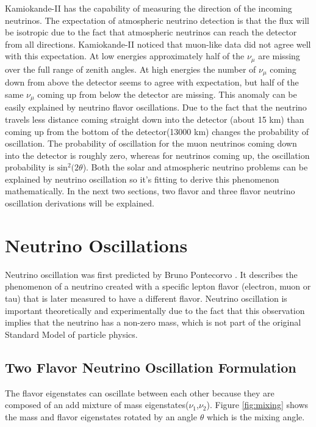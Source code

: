Kamiokande-II has the capability of measuring the direction of the incoming neutrinos. The expectation of atmospheric neutrino detection is that the flux will be isotropic due to the fact that atmospheric neutrinos can reach the detector from all directions. Kamiokande-II noticed that muon-like data did not agree well with this expectation. At low energies approximately half of the $\nu_{\mu}$ are missing over the full range of zenith angles. At high energies the number of $\nu_{\mu}$ coming down from above the detector seems to agree with expectation, but half of the same $\nu_{\mu}$ coming up from below the detector are missing. This anomaly can be easily explained by neutrino flavor oscillations. Due to the fact that the neutrino travels less distance coming straight down into the detector (about 15 km) than coming up from the bottom of the detector(13000 km) changes the probability of oscillation. The probability of oscillation for the muon neutrinos coming down into the detector is roughly zero, whereas for neutrinos coming up, the oscillation probability is $\text{sin}^2(2\theta$). Both the solar and atmospheric neutrino problems can be explained by neutrino oscillation so it's fitting to derive this phenomenon mathematically. In the next two sections, two flavor and three flavor neutrino oscillation derivations will be explained. 


\section{Neutrino Oscillations}\label{section:oscillations}
Neutrino oscillation was first predicted by Bruno Pontecorvo \cite{pontecorvo}. It describes the phenomenon of a neutrino created with a specific lepton flavor (electron, muon or tau) that is later measured to have a different flavor. Neutrino oscillation is important theoretically and experimentally due to the fact that this observation implies that the neutrino has a non-zero mass, which is not part of the original Standard Model of particle physics. 

\subsection{Two Flavor Neutrino Oscillation Formulation}
The flavor eigenstates can oscillate between each other because they are composed of an add mixture of mass eigenstates($\nu_{1}$,$\nu_{2}$). Figure \ref{fig:mixing} shows the mass and flavor eigenstates rotated by an angle $\theta$ which is the mixing angle. 

